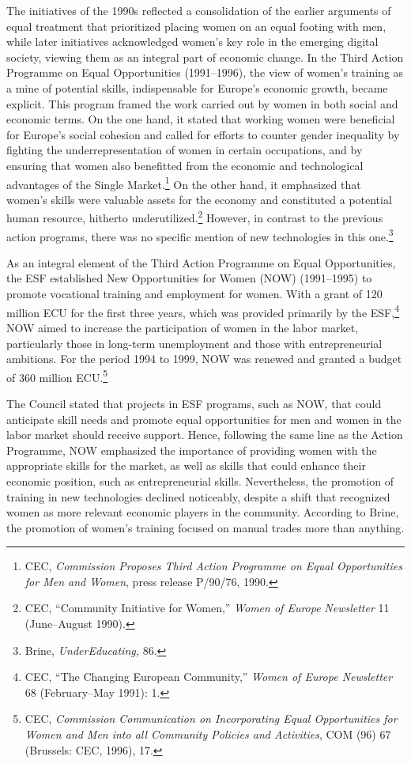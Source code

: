 \documentclass{tufte-handout}
\begin{document}
\newpage The initiatives of the 1990s reflected a consolidation of the earlier
arguments of equal treatment that prioritized placing women on an equal
footing with men, while later initiatives acknowledged women's key role
in the emerging digital society, viewing them as an integral part of
economic change. In the Third Action Programme on Equal Opportunities
(1991--1996), the view of women's training as a mine of potential
skills, indispensable for Europe's economic growth, became explicit.
This program framed the work carried out by women in both social and
economic terms. On the one hand, it stated that working women were
beneficial for Europe's social cohesion and called for efforts to
counter gender inequality by fighting the underrepresentation of women
in certain occupations, and by ensuring that women also benefitted from
the economic and technological advantages of the Single
Market.\footnote{CEC, \emph{Commission Proposes Third Action Programme
  on Equal Opportunities for Men and Women}, press release P/90/76,
  1990.} On the other hand, it emphasized that women's skills were
valuable assets for the economy and constituted a potential human
resource, hitherto underutilized.\footnote{CEC, ``Community Initiative
  for Women,'' \emph{Women of Europe} \emph{Newsletter} 11 (June--August
  1990).} However, in contrast to the previous action programs, there
was no specific mention of new technologies in this one.\footnote{Brine,
  \emph{UnderEducating,} 86.}

As an integral element of the Third Action Programme on Equal
Opportunities, the ESF established New Opportunities for Women (NOW)
(1991--1995) to promote vocational training and employment for women.
With a grant of 120 million ECU for the first three years, which was
provided primarily by the ESF,\footnote{CEC, ``The Changing European
  Community,'' \emph{Women of Europe Newsletter} 68 (February--May
  1991): 1.} NOW aimed to increase the participation of women in the
labor market, particularly those in long-term unemployment and those
with entrepreneurial ambitions. For the period 1994 to 1999, NOW was
renewed and granted a budget of 360 million ECU.\footnote{CEC,
  \emph{Commission Communication on Incorporating Equal Opportunities
  for Women and Men into all Community Policies and Activities}, COM
  (96) 67 (Brussels: CEC, 1996), 17.}

The Council stated that projects in ESF programs, such as NOW, that
could anticipate skill needs and promote equal opportunities for men and
women in the labor market should receive support. Hence, following the
same line as the Action Programme, NOW emphasized the importance of
providing women with the appropriate skills for the market, as well as
skills that could enhance their economic position, such as
entrepreneurial skills. Nevertheless, the promotion of training in new
technologies declined noticeably, despite a shift that recognized women
as more relevant economic players in the community. According to Brine,
the promotion of women's training focused on manual trades more than
anything.
\end{document}
